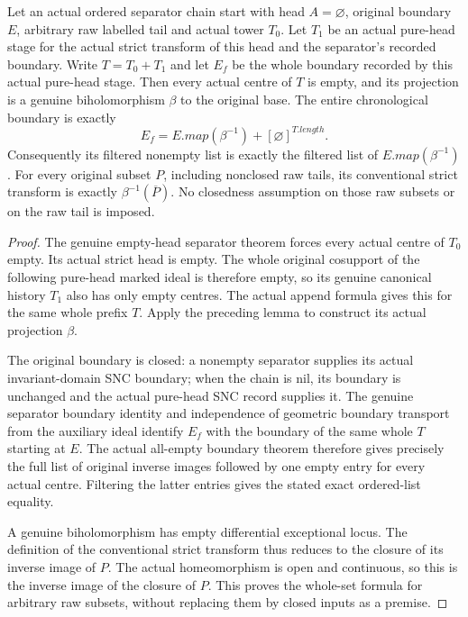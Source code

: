 \begin{theorem}
\label{hir:original-empty-head-prefix-projection}
\leanok
Let an actual ordered separator chain start with head $A=\varnothing$,
original boundary $E$, arbitrary raw labelled tail and actual tower
$T_0$. Let $T_1$ be an actual pure-head stage for the actual strict
transform of this head and the separator's recorded boundary. Write
$T=T_0\mathbin{+}T_1$ and let $E_f$ be the whole boundary recorded by
this actual pure-head stage. Then every actual centre of $T$ is empty,
and its projection is a genuine biholomorphism $\beta$ to the original
base. The entire chronological boundary is exactly
\[
 E_f=E.map(\beta^{-1})+ [\varnothing]^{T.length}.
\]
Consequently its filtered nonempty list is exactly the filtered list
of $E.map(\beta^{-1})$. For every original subset $P$, including
nonclosed raw tails, its conventional strict transform is exactly
$\beta^{-1}(\overline P)$. No closedness assumption on those raw
subsets or on the raw tail is imposed.
\end{theorem}
\begin{proof}
The genuine empty-head separator theorem forces every actual centre
of $T_0$ empty. Its actual strict head is empty. The whole original
cosupport of the following pure-head marked ideal is therefore empty,
so its genuine canonical history $T_1$ also has only empty centres.
The actual append formula gives this for the same whole prefix $T$.
Apply the preceding lemma to construct its actual projection $\beta$.

The original boundary is closed: a nonempty separator supplies its
actual invariant-domain SNC boundary; when the chain is nil, its
boundary is unchanged and the actual pure-head SNC record supplies
it. The genuine separator boundary identity and independence of
geometric boundary transport from the auxiliary ideal identify $E_f$
with the boundary of the same whole $T$ starting at $E$. The actual
all-empty boundary theorem therefore gives precisely the full list
of original inverse images followed by one empty entry for every
actual centre. Filtering the latter entries gives the stated exact
ordered-list equality.

A genuine biholomorphism has empty differential exceptional locus.
The definition of the conventional strict transform thus reduces to
the closure of its inverse image of $P$. The actual homeomorphism is
open and continuous, so this is the inverse image of the closure of
$P$. This proves the whole-set formula for arbitrary raw subsets,
without replacing them by closed inputs as a premise.
\end{proof}
